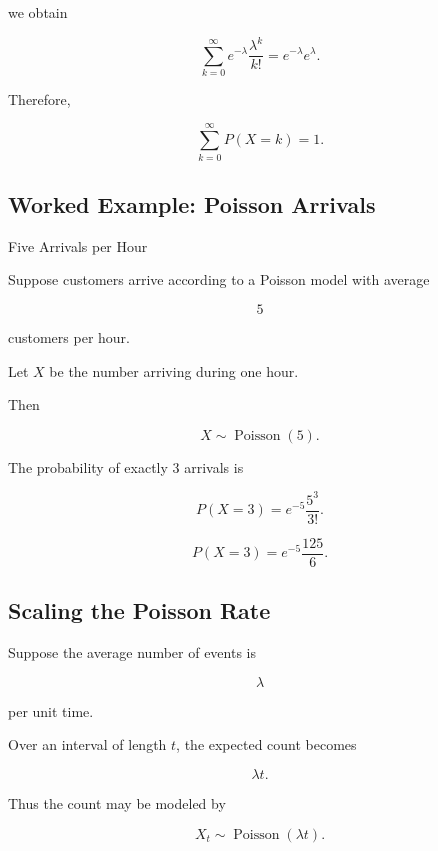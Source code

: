 we obtain

\[
\sum_{k=0}^{\infty}
e^{-\lambda}
\frac{\lambda^k}{k!}
=
e^{-\lambda}e^\lambda.
\]

Therefore,

\[
\boxed{
\sum_{k=0}^{\infty}P(X=k)=1.
}
\]

\subsection{Worked Example: Poisson Arrivals}
\label{subsec:worked-poisson-arrivals}

\begin{workedexamplebox}{Five Arrivals per Hour}

Suppose customers arrive according to a Poisson model with average

\[
5
\]

customers per hour.

Let \(X\) be the number arriving during one hour.

Then

\[
X\sim\operatorname{Poisson}(5).
\]

The probability of exactly \(3\) arrivals is

\[
P(X=3)
=
e^{-5}
\frac{5^3}{3!}.
\]

\begin{answerbox}
\[
\boxed{
P(X=3)
=
e^{-5}
\frac{125}{6}.
}
\]
\end{answerbox}

\end{workedexamplebox}

\subsection{Scaling the Poisson Rate}
\label{subsec:poisson-rate-scaling}

Suppose the average number of events is

\[
\lambda
\]

per unit time.

Over an interval of length \(t\), the expected count becomes

\[
\lambda t.
\]

Thus the count may be modeled by

\[
\boxed{
X_t
\sim
\operatorname{Poisson}(\lambda t).
}
\]

